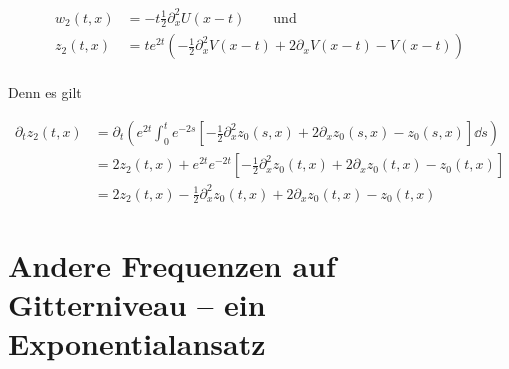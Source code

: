 \begin{align*}
w_2(t,x) &= - t \frac{1}{2} \partial^2_x U(x - t) \qquad \text{und}\\
z_2(t,x) &= t e^{2t} \left( - \frac{1}{2} \partial^2_x V(x - t) + 2 \partial_x V(x - t) - V(x - t) \right)\\
\end{align*}

Denn es gilt 

\begin{align*}
\partial_t z_2(t,x) &= \partial_t \left( e^{2t} \int_0^t e^{-2s} \left[ - \frac{1}{2} \partial^2_x z_0(s, x) + 2 \partial_x z_0(s, x) - z_0(s,x) \right] \dd s \right)\\
&= 2 z_2(t,x) + e^{2t} e^{-2t} \left[ - \frac{1}{2} \partial^2_x z_0(t, x) + 2 \partial_x z_0(t, x) - z_0(t,x) \right]\\
&= 2 z_2(t,x) - \frac{1}{2} \partial^2_x z_0(t, x) + 2 \partial_x z_0(t, x) - z_0(t,x)
\end{align*}

\section{Andere Frequenzen auf Gitterniveau -- ein Exponentialansatz}